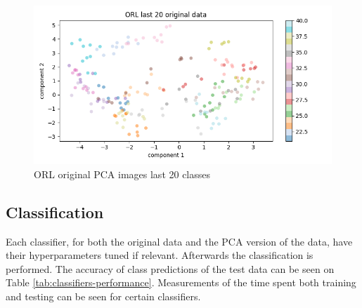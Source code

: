 \begin{figure}[htbp]
        \centering
        \includegraphics[width=1\columnwidth]{../source/orl/pictures/orl-scatter-original-second.png}
        \caption{ORL original PCA images last 20 classes}
        \label{fig:orl-scatter-second}
\end{figure}

\subsection{Classification}
Each classifier, for both the original data and the PCA version of the data, have their hyperparameters tuned if relevant. Afterwards the classification is performed.  
The accuracy of class predictions of the test data can be seen on Table \ref{tab:classifiers-performance}. Measurements of the time spent both training and testing can be seen for certain classifiers. 


